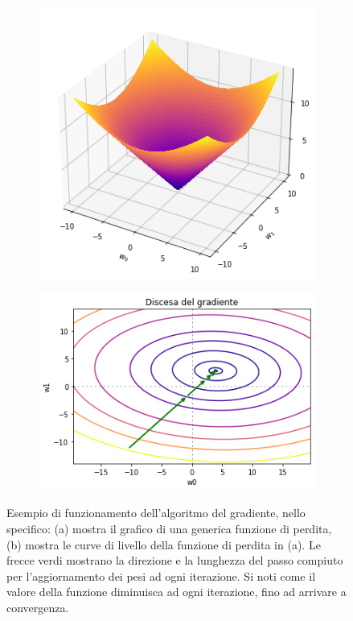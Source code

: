 \documentclass[../../main.tex]{subfiles}
\begin{document}
    \begin{figure}[H]
        \centering
        \begin{subfigure}[t]{0.49\textwidth}
            \centering
            \includegraphics[width=\textwidth]{immagini/4_1/loss_function.png} 
            \caption{}
            \label{fig:funzioneLoss}      
        \end{subfigure}
        \begin{subfigure}[t]{0.49\textwidth}
            \centering
            \includegraphics[width=\textwidth]{immagini/4_1/discesa_gradiente.png} 
            \caption{}
            \label{fig:curveLivello}      
        \end{subfigure}
        \caption{Esempio di funzionamento dell'algoritmo del gradiente, nello specifico: (a) mostra il grafico di una generica funzione di perdita, (b) mostra le curve di livello della funzione di perdita in (a). Le frecce verdi mostrano la direzione e la lunghezza  del  passo  compiuto  per  l’aggiornamento dei pesi ad ogni iterazione. Si noti come il valore della funzione diminuisca ad ogni iterazione, fino ad arrivare a convergenza. }
        \label{fig:gradient_descent}
    \end{figure}
\end{document}
